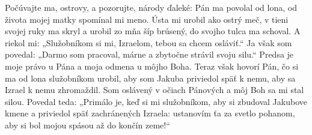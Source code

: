 Počúvajte ma, ostrovy,
a pozorujte, národy ďaleké:
Pán ma povolal od lona,
od života mojej matky spomínal mi meno.
Ústa mi urobil ako ostrý meč,
v tieni svojej ruky ma skryl
a urobil zo mňa šíp brúsený,
do svojho tulca ma schoval.
A riekol mi: „Služobníkom si mi,
Izraelom, tebou sa chcem osláviť.“
Ja však som povedal: „Darmo som pracoval,
márne a zbytočne strávil svoju silu.“
Predsa je moje právo u Pána
a moja odmena u môjho Boha.
Teraz však hovorí Pán,
čo si ma od lona služobníkom urobil,
aby som Jakuba priviedol späť k nemu,
aby sa Izrael k nemu zhromaždil.
Som oslávený v očiach Pánových
a môj Boh sa mi stal silou.
Povedal teda:
„Primálo je, keď si mi služobníkom,
aby si zbudoval Jakubove kmene
a priviedol späť zachránených Izraela:
ustanovím ťa za svetlo pohanom,
aby si bol mojou spásou až do končín zeme!“